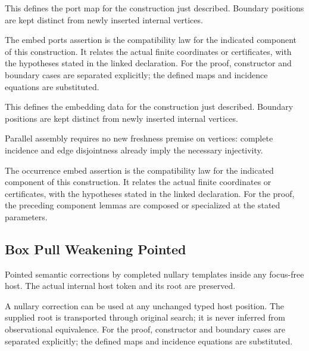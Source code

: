 This defines the port map for the construction just described. Boundary positions are kept distinct from newly inserted internal vertices.
\par{}

The embed ports assertion is the compatibility law for the indicated component of this construction. It relates the actual finite coordinates or certificates, with the hypotheses stated in the linked declaration.
For the proof, constructor and boundary cases are separated explicitly; the defined maps and incidence equations are substituted.
\par{}

This defines the embedding data for the construction just described. Boundary positions are kept distinct from newly inserted internal vertices.
\par{}

Parallel assembly requires no new freshness premise on vertices: complete incidence and edge disjointness already imply the necessary injectivity.
\par{}

The occurrence embed assertion is the compatibility law for the indicated component of this construction. It relates the actual finite coordinates or certificates, with the hypotheses stated in the linked declaration.
For the proof, the preceding component lemmas are composed or specialized at the stated parameters.
\par{}

\subsection{Box Pull Weakening Pointed}
Pointed semantic corrections by completed nullary templates inside any focus-free host. The actual internal host token and its root are preserved.

A nullary correction can be used at any unchanged typed host position. The supplied root is transported through original search; it is never inferred from observational equivalence.
For the proof, constructor and boundary cases are separated explicitly; the defined maps and incidence equations are substituted.
\par{}

